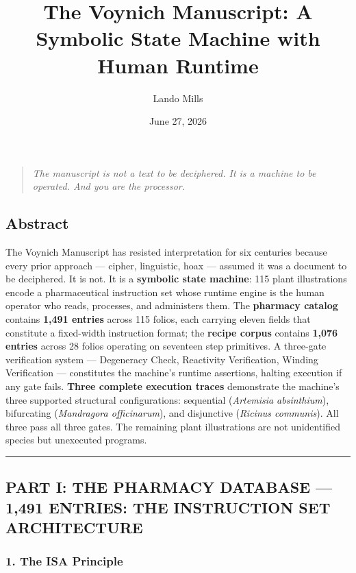 \documentclass[12pt,a4paper]{article}
\title{The Voynich Manuscript: A Symbolic State Machine with Human Runtime}
\date{June 27, 2026}
\author{Lando Mills}
\begin{document}
\maketitle
\begin{quote}
\emph{The manuscript is not a text to be deciphered. It is a machine to
be operated. And you are the processor.}
\end{quote}

\hypertarget{abstract}{%
\subsection{Abstract}\label{abstract}}

The Voynich Manuscript has resisted interpretation for six centuries
because every prior approach --- cipher, linguistic, hoax --- assumed it
was a document to be deciphered. It is not. It is a \textbf{symbolic
state machine}: 115 plant illustrations encode a pharmaceutical
instruction set whose runtime engine is the human operator who reads,
processes, and administers them. The \textbf{pharmacy catalog} contains
\textbf{1,491 entries} across 115 folios, each carrying eleven fields
that constitute a fixed-width instruction format; the \textbf{recipe
corpus} contains \textbf{1,076 entries} across 28 folios operating on
seventeen step primitives. A three-gate verification system ---
Degeneracy Check, Reactivity Verification, Winding Verification ---
constitutes the machine's runtime assertions, halting execution if any
gate fails. \textbf{Three complete execution traces} demonstrate the
machine's three supported structural configurations: sequential
(\emph{Artemisia absinthium}), bifurcating (\emph{Mandragora
officinarum}), and disjunctive (\emph{Ricinus communis}). All three pass
all three gates. The remaining plant illustrations are not unidentified
species but unexecuted programs.

\begin{center}\rule{0.5\linewidth}{0.5pt}\end{center}

\hypertarget{part-i-the-pharmacy-database-1491-entries-the-instruction-set-architecture}{%
\subsection{PART I: THE PHARMACY DATABASE --- 1,491 ENTRIES: THE
INSTRUCTION SET
ARCHITECTURE}\label{part-i-the-pharmacy-database-1491-entries-the-instruction-set-architecture}}

\hypertarget{the-isa-principle}{%
\subsubsection{1. The ISA Principle}\label{the-isa-principle}}
\end{document}
